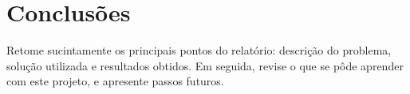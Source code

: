\section{Conclusões}\label{sec:conclusoes}

Retome sucintamente os principais pontos do relatório: descrição do problema, solução utilizada e resultados obtidos.  Em seguida, revise o que se pôde aprender com este projeto, e apresente passos futuros.			

